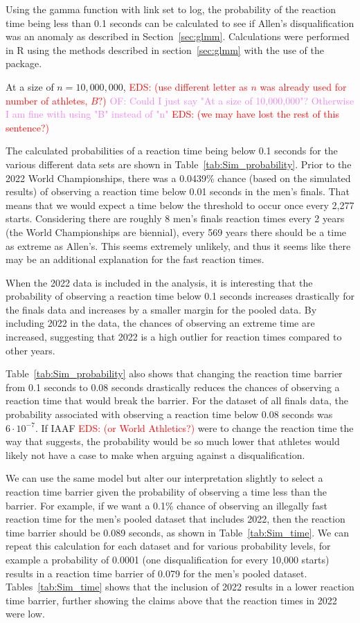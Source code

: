 \documentclass[12pt, letterpaper, titlepage]{article}
\newcommand{\eds}[1]{\textcolor{red}{EDS: (#1)}}
\newcommand{\of}[1]{\textcolor{violet}{OF: #1}}
\begin{document}
Using the gamma function with link set to log, the probability of the reaction 
time being less than 0.1 seconds can be calculated to see if Allen's 
disqualification was an anomaly as described in Section~\ref{sec:glmm}.
Calculations were performed in R using the methods described in 
section~\ref{sec:glmm} with the use of the \citet{lme4} package.


At a size of $n=10,000,000$, \eds{use different letter as $n$ was already used 
for number of athletes, $B?$} \of{Could I just say "At a size of 10,000,000"? 
Otherwise I am fine with using "B" instead of "n"} \eds{we may have lost the 
rest of this sentence?}


The calculated probabilities of a reaction time 
being below 0.1 seconds for the various different data sets are shown in 
Table~\ref{tab:Sim_probability}. Prior to the 2022 World Championships, there 
was a 0.0439\% chance (based on the
simulated results) of observing a reaction time below 0.01 seconds in the men's
finals.
That means that we would expect a time below the threshold to occur
once every 2,277 starts.  Considering there are roughly 8 men's finals reaction
times every 2 years (the World Championships are biennial), every 569 years there
should be a time as extreme as Allen's. This seems extremely unlikely, and thus
it seems like there may be an additional explanation for the fast reaction times.


When the 2022 data is included in the analysis, it is interesting that the 
probability of observing a reaction time below 0.1 seconds increases drastically 
for the finals data and increases by a smaller margin for the pooled data.  By
including 2022 in the data, the chances of observing an extreme time are 
increased, suggesting that 2022 is a high outlier for reaction times compared to
 other years.


Table~\ref{tab:Sim_probability} also shows that changing the reaction time 
barrier from 0.1 seconds to 0.08 seconds drastically reduces the chances of 
observing a reaction time that would break the barrier.  For the dataset of all 
finals data, the probability
associated with observing a reaction time below 0.08 seconds was $6\cdot10^{-7}$.
If IAAF \eds{or World Athletics?} were to change the reaction time the way that 
\citet{komi2009iaaf}
suggests, the probability would be so much lower that athletes would likely not
have a case to make when arguing against a disqualification.

We can use the same model but alter our interpretation slightly to select a 
reaction time barrier given the probability of observing a time less than the 
barrier.  For example, if we want a 0.1\% chance of observing an illegally fast 
reaction time for the men's pooled dataset that includes 2022, then the reaction
time barrier should be 0.089 seconds, as shown in Table~\ref{tab:Sim_time}.  We
can repeat this calculation for each dataset and for various probability levels,
for example a probability of 0.0001 (one disqualification for every 10,000 starts)
results in a reaction time barrier of 0.079 for the men's pooled dataset.  
Tables~\ref{tab:Sim_time} shows that the inclusion of 2022 results in a lower
reaction time barrier, further showing the claims above that the reaction times
in 2022 were low.
\end{document}

